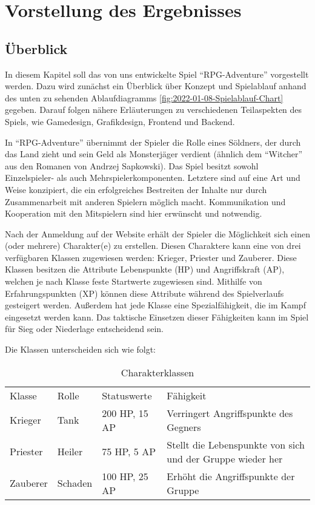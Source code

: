 

\section{Vorstellung des Ergebnisses}

\subsection{Überblick}
In diesem Kapitel soll das von uns entwickelte Spiel \enquote{RPG-Adventure} vorgestellt werden. Dazu wird zunächst ein Überblick über Konzept und Spielablauf anhand des unten zu sehenden Ablaufdiagramms \ref{fig:2022-01-08-Spielablauf-Chart} gegeben. Darauf folgen nähere Erläuterungen zu verschiedenen Teilaspekten des Spiels, wie Gamedesign, Grafikdesign, Frontend und Backend. 

In \enquote{RPG-Adventure} übernimmt der Spieler die Rolle eines Söldners, der durch das Land zieht und sein Geld als Monsterjäger verdient (ähnlich dem \enquote{Witcher} aus den Romanen von Andrzej Sapkowski). Das Spiel besitzt sowohl Einzelspieler- als auch Mehrspielerkomponenten. Letztere sind auf eine Art und Weise konzipiert, die ein erfolgreiches Bestreiten der Inhalte nur durch Zusammenarbeit mit anderen Spielern möglich macht. Kommunikation und Kooperation mit den Mitspielern sind hier erwünscht und notwendig. 

Nach der Anmeldung auf der Website erhält der Spieler die Möglichkeit sich einen (oder mehrere) Charakter(e) zu erstellen. Diesen Charaktere kann eine von drei verfügbaren Klassen zugewiesen werden: Krieger, Priester und Zauberer. Diese Klassen besitzen die Attribute Lebenspunkte (HP) und Angriffskraft (AP), welchen je nach Klasse feste Startwerte zugewiesen sind. Mithilfe von Erfahrungspunkten (XP) können diese Attribute während des Spielverlaufs gesteigert werden. Außerdem hat jede Klasse eine Spezialfähigkeit, die im Kampf eingesetzt werden kann. Das taktische Einsetzen dieser Fähigkeiten kann im Spiel für Sieg oder Niederlage entscheidend sein.

Die Klassen unterscheiden sich wie folgt:

\begin{table}[H]
    \caption{Charakterklassen}
    \label{tlb: class_table}
\begin{tabular}{ |p{}||p{}|p{}|p{}|} \hline
    Klasse & Rolle & Statuswerte & Fähigkeit \\ \hhline{|=||=|=|=|}
    Krieger & Tank & 200 HP, 15 AP & Verringert Angriffspunkte des Gegners \\ \hline
    Priester & Heiler & 75 HP, 5 AP & Stellt die Lebenspunkte von sich und der Gruppe wieder her \\ \hline
    Zauberer & Schaden & 100 HP, 25 AP & Erhöht die Angriffspunkte der Gruppe \\ \hline
\end{tabular}
\end{table}

